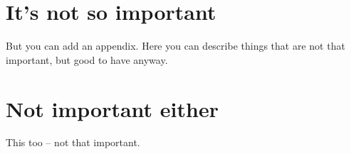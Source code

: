 
\section{It's not so important} \label{app:first}

But you can add an appendix. 
Here you can describe things that are not that important, but good to have anyway.



\section{Not important either} \label{app:second}

This too -- not that important.